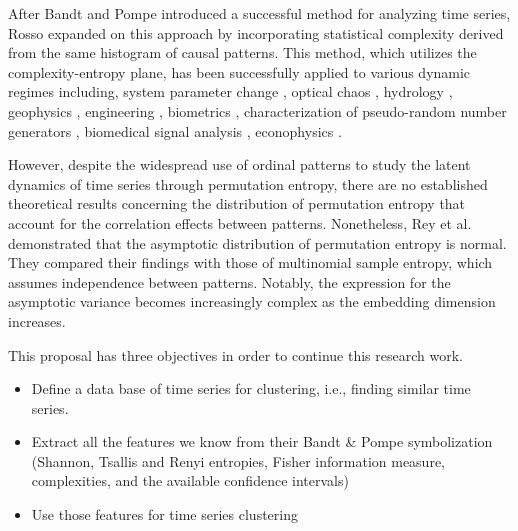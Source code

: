 After Bandt and Pompe introduced a successful method for analyzing time series, Rosso \cite{Rosso2007} expanded on this approach by incorporating statistical complexity derived from the same histogram of causal patterns. This method, which utilizes the complexity-entropy plane, has been successfully applied to various dynamic regimes including, system parameter change \cite{Cao2004,Bandt2005,Kowalski2007,Zunino2010a,Rosso2010a,Kowalski2011b,Zunino2012a, DeMicco2012a}, optical chaos \cite{Soriano2011a,Zunino2011a,Toomey2014,Yang2015e,Liu2016f}, hydrology \cite{Lange2013,Serinaldi2014,Stosic2016}, geophysics \cite{Consolini2014,Saco2010,Sippel2016}, engineering \cite{Yan2012,Aquino2015,Aquino2017,Redelico2017a}, biometrics \cite{Rosso2016}, characterization of pseudo-random number generators \cite{DeMicco2008,DeMicco2009}, biomedical signal analysis \cite{Zanin2012,Li2007,Li2008b,Parlitz2012,Morabito2012,Li2014b,Montani2014,Montani2014a,Liang2015b,Montani2015a,Montani2015}, econophysics \cite{Zanin2012,Zunino2010,Zunino2009, Bariviera2015a,Bariviera2015,Bariviera2016,Zunino2016a}.



 

However, despite the widespread use of ordinal patterns to study the latent dynamics of time series through permutation entropy, there are no established theoretical results concerning the distribution of permutation entropy that account for the correlation effects between patterns. Nonetheless, Rey et al. \cite{Rey2023a} demonstrated that the asymptotic distribution of permutation entropy is normal. They compared their findings with those of multinomial sample entropy, which assumes independence between patterns. Notably, the expression for the asymptotic variance becomes increasingly complex as the embedding dimension increases. 

This proposal has three objectives in order to continue this research work.
\begin{itemize}
	\item Define a data base of time series for clustering, i.e., finding similar time series. 
	\item Extract all the features we know from their Bandt \& Pompe symbolization (Shannon, Tsallis and Renyi entropies, Fisher information measure, complexities, and the available confidence intervals)
	\item Use those features for time series clustering 
\end{itemize} 




